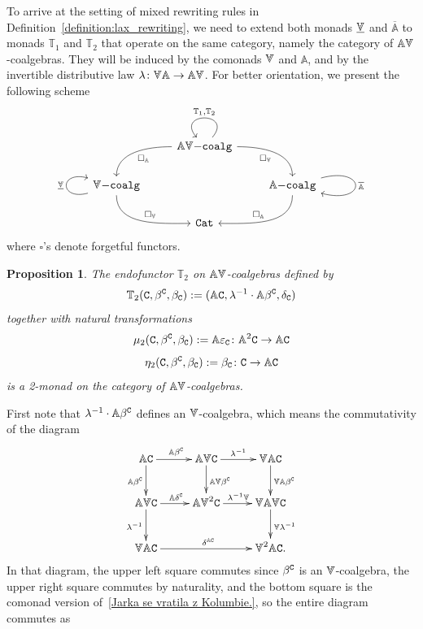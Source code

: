 \documentclass[12pt,leqno]{amsart}
\newtheorem{proposition}[theorem]{Proposition}
\theoremstyle{definition}
\def\T{\mathbb{T}}
\def\Ar{\mathbb{A}}
\newcommand{\C}{{\tt C}}
\newcommand{\4}{\texttt{4}}
\newcommand{\oAr}{\overline{\Ar}}
\newcommand{\Vr}{\text{\raisebox{\depth}{\scalebox{1}[-1]{$\Ar$}}}}
\newcommand{\uVr}{\underline{\text{\raisebox{\depth}{\scalebox{1}[-1]{$\Ar$}}}}}
\renewcommand{\epsilon}{\varepsilon}
\let\pf\proof
\begin{document}
To arrive at the setting of mixed rewriting rules in
Definition~\ref{definition:lax_rewriting}, we need to extend both
monads $\uVr$ and $\oAr$ to monads $\T_1$ and $\T_2$ that
operate on the same category, namely the
category of $\Ar\Vr$-coalgebras. They will be induced 
by the comonads $\Vr$ and $\Ar$, and by the invertible
distributive law $\lambda\colon \Vr\Ar\rightarrow\Ar\Vr$. For better
orientation, we present the following
scheme
\[
\begin{tikzcd}
	& {\Ar\Vr\tt{-coalg}} & \\
	{\Vr\tt{-coalg}} && {\Ar\tt{-coalg}} \\
	& \tt{Cat}
	\arrow["{\T_1, \T_2}"', from=1-2, to=1-2, loop ,distance=3em, in=130, out=50]
    \arrow["{\square_\Ar}",from=1-2, to=2-1, in=90,out=180]
	\arrow["{\square_\Vr}"',  in=90, out=0,from=1-2, to=2-3]
	\arrow["\uVr", from=2-1, to=2-1, loop left,looseness=5]
	\arrow["{\square_\Vr}",  in=180, out=270,from=2-1, to=3-2]
	\arrow["\oAr", from=2-3, to=2-3, loop right]
	\arrow["{\square_\Ar}"', in=0,out=270,from=2-3, to=3-2]
\end{tikzcd}
\]
where $\square$'s denote forgetful functors.
\begin{proposition}
    The endofunctor $\T_2$ on $\Ar\Vr$-coalgebras defined by
    $$\T_2(\C,\beta^\C,\beta_\C):=(\Ar\C,\lambda^{-1}\cdot \Ar\beta^\C,\delta_\C)$$
    together with natural transformations 
    $${\mu_2}{(\C,\beta^\C,\beta_\C)}:=\Ar\epsilon_\C\colon \Ar^2 \C \to \Ar\C$$
$${\eta_2}{(\C,\beta^\C,\beta_\C)}:=\beta_\C\colon \C\to \Ar\C$$
is a 2-monad on the category of \/$\Ar\Vr$-coalgebras.
\end{proposition}
\pf First note that $\lambda^{-1}\cdot \Ar\beta^\C$ defines an
$\Vr$-coalgebra, which means the  commutativity of the
diagram
\begin{equation*}
\xymatrix@R=2.5em@C=2.5em{
\Ar\C \ar[d]_{\Ar\beta^\C} \ar[r]^{\Ar\beta^\C}&
\Ar\Vr\C \ar[r]^{\lambda^{-1}} \ar[d]^{\Ar\Vr\beta^\C}
& \Vr\Ar\C \ar[d]^{\Vr\Ar\beta^\C}
\\
\Ar\Vr\C \ar[d]_{\lambda^{-1}} \ar[r]^{\Ar\delta^\C}& \Ar\Vr^2 \C \ar[r]^{\lambda^{-1}\Vr}& \Vr\Ar\Vr\C\ar[d]^{\Vr\lambda^{-1}}
\\
\Vr\Ar\C \ar[rr]^{\delta^{\Ar\C}}&& \Vr^2\Ar\C.
}
\end{equation*}
In that diagram, the upper left square commutes since $\beta^\C$ is an
$\Vr$-coalgebra, the upper right square commutes by naturality, and
the bottom square is the comonad version of~\eqref{Jarka se vratila z
  Kolumbie.}, so the entire diagram commutes as
\end{document}
